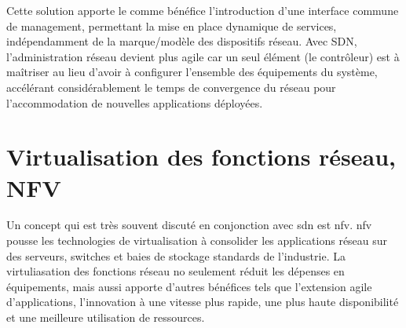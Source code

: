 
Cette solution apporte le comme bénéfice l'introduction d'une interface commune de management, permettant la mise en place dynamique de services, indépendamment de la marque/modèle des dispositifs réseau. Avec SDN, l'administration réseau devient plus agile car un seul élément (le contrôleur) est à maîtriser au lieu d'avoir à configurer l'ensemble des équipements du système, accélérant considérablement le temps de convergence du réseau pour l'accommodation de nouvelles applications déployées.





\section{Virtualisation des fonctions réseau, NFV}


Un concept qui est très souvent discuté en conjonction avec \gls{sdn} est \gls{nfv}. \gls{nfv} pousse les technologies de virtualisation à consolider les applications réseau sur des serveurs, switches et baies de stockage standards de l'industrie. La virtuliasation des fonctions réseau no seulement réduit les dépenses en équipements, mais aussi apporte d'autres bénéfices tels que l'extension agile d'applications, l'innovation à une vitesse plus rapide, une plus haute disponibilité et une meilleure utilisation de ressources.

